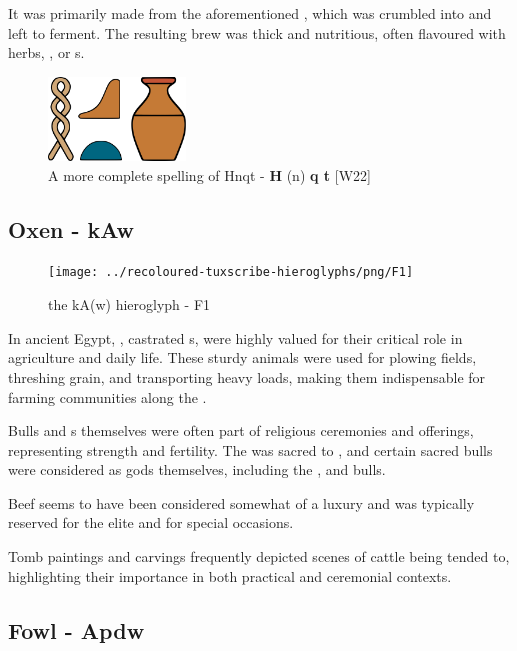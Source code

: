 It was primarily made from the aforementioned , which was crumbled into  and left to ferment. The resulting brew was thick and nutritious, often flavoured with herbs, , or s.

\begin{figure} [H]
	\centering
	\includegraphics[width=0.325\textwidth]{../images/hnqt}
	\caption{A more complete spelling of Hnqt - \textbf{H} (n) \textbf{q t} [W22]}
\end{figure}

\subsection*{Oxen - kAw}

\begin{figure} [H]
	\centering
	\texttt{[image: ../recoloured-tuxscribe-hieroglyphs/png/F1]}
	\caption{the kA(w) hieroglyph - F1}
\end{figure}

In ancient Egypt, , castrated s, were highly valued for their critical role in agriculture and daily life. These sturdy animals were used for plowing fields, threshing grain, and transporting heavy loads, making them indispensable for farming communities along the .

Bulls and s themselves were often part of religious ceremonies and offerings, representing strength and fertility. The  was sacred to , and certain sacred bulls were considered as gods themselves, including the ,  and  bulls.

Beef seems to have been considered somewhat of a luxury and was typically reserved for the elite and for special occasions.

Tomb paintings and carvings frequently depicted scenes of cattle being tended to, highlighting their importance in both practical and ceremonial contexts.

\subsection*{Fowl - Apdw}

